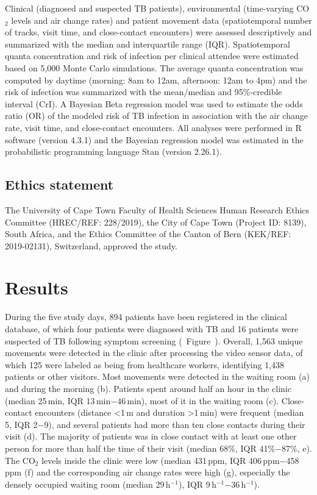 \documentclass[fleqn,11pt]{wlscirep}
\begin{document}
Clinical (diagnosed and suspected TB patients), environmental (time-varying CO$_2$ levels and air change rates) and patient movement data (spatiotemporal number of tracks, visit time, and close-contact encounters) were assessed descriptively and summarized with the median and interquartile range (IQR). Spatiotemporal quanta concentration and risk of infection per clinical attendee were estimated based on 5,000 Monte Carlo simulations. The average quanta concentration was computed by daytime (morning: 8am to 12am, afternoon: 12am to 4pm) and the risk of infection was summarized with the mean/median and 95\%-credible interval (CrI). A Bayesian Beta regression model was used to estimate the odds ratio (OR) of the modeled risk of TB infection in association with the air change rate, visit time, and close-contact encounters. All analyses were performed in R software (version 4.3.1) and the Bayesian regression model was estimated in the probabilistic programming language Stan (version 2.26.1).


\subsection{Ethics statement}

The University of Cape Town Faculty of Health Sciences Human Research Ethics Committee (HREC/REF: 228/2019), the City of Cape Town (Project ID: 8139), South Africa, and the Ethics Committee of the Canton of Bern (KEK/REF: 2019-02131), Switzerland, approved the study.

\newpage

\section{Results}

During the five study days, 894 patients have been registered in the clinical database, of which four patients were diagnosed with TB and 16 patients were suspected of TB following symptom screening (\supp~Figure~). Overall, 1,563 unique movements were detected in the clinic after processing the video sensor data, of which 125 were labeled as being from healthcare workers, identifying 1,438 patients or other visitors. Most movements were detected in the waiting room (a) and during the morning (b). Patients spent around half an hour in the clinic (median 25\,min, IQR 13\,min$-$46\,min), most of it in the waiting room (c). Close-contact encounters (distance <1\,m and duration >1\,min) were frequent (median 5, IQR 2$-$9), and several patients had more than ten close contacts during their visit (d). The majority of patients was in close contact with at least one other person for more than half the time of their visit (median 68\%, IQR 41\%$-$87\%, e). The CO$_2$ levels inside the clinic were low (median 431\,ppm, IQR 406\,ppm$-$458\,ppm (f) and the corresponding air change rates were high (g), especially the densely occupied waiting room (median 29\,h$^{-1}$), IQR 9\,h$^{-1}$$-$36\,h$^{-1}$). 
\end{document}
